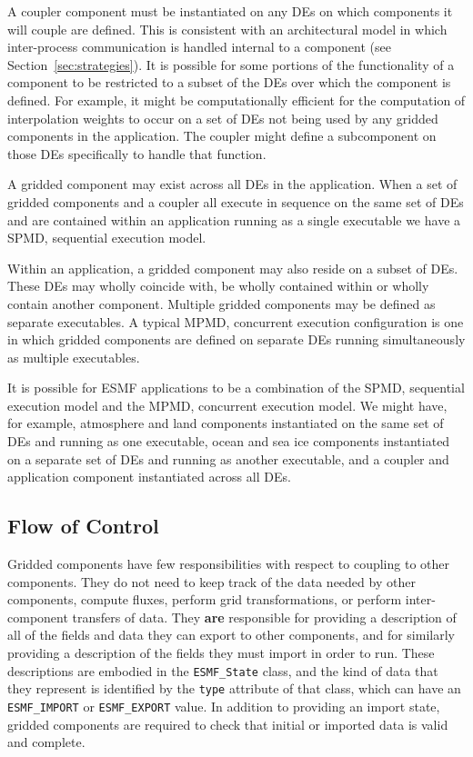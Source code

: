 A coupler component must be instantiated on any DEs on which components
it will couple are defined.  This is consistent with an architectural
model in which inter-process communication is handled internal to 
a component (see Section~\ref{sec:strategies}).  It is possible for
some portions of the functionality of a component to be restricted to
a subset of the DEs over which the component is defined.  For example, 
it might be computationally efficient for the computation of interpolation
weights to occur on a set of DEs not being used by any gridded components
in the application.  The coupler might define a subcomponent on those DEs 
specifically to handle that function.

A gridded component may exist across all DEs in the application.  When 
a set of gridded  components and a coupler all execute in sequence on 
the same set of DEs and are contained within an application running 
as a single executable we have a SPMD, sequential execution model.  

Within an application, a gridded component may also reside on 
a subset of DEs.  These DEs may wholly coincide with, be wholly 
contained within or wholly contain another component.  Multiple gridded 
components may be defined as separate executables.  A typical 
MPMD, concurrent execution configuration is one in which gridded components 
are defined on separate DEs running simultaneously as multiple 
executables.  

It is possible for ESMF applications to be a combination of the SPMD, 
sequential 
execution model and the MPMD, concurrent execution model.  We might have,
for example, atmosphere and land components instantiated on the same set of 
DEs and running as one executable, ocean and sea ice 
components instantiated on a separate set of DEs and running as 
another executable, and a coupler and application component 
instantiated across all DEs.

\subsection{Flow of Control}

Gridded components have few responsibilities with respect to coupling
to other components.  They do not need to keep track of the data needed
by other components, compute fluxes, perform grid transformations, or 
perform inter-component transfers of data.  They {\bf are} responsible for 
providing a description of all of the fields and data they
can export to other components, and for similarly providing a description 
of the fields they must import in order to run.  These descriptions are
embodied in the {\tt ESMF\_State} class, and the kind of data that they 
represent is identified by the {\tt type} attribute of that class, which can
have an {\tt ESMF\_IMPORT} or {\tt ESMF\_EXPORT} value.  In addition to 
providing an import state, gridded components are required to check that 
initial or imported data is valid and complete.

